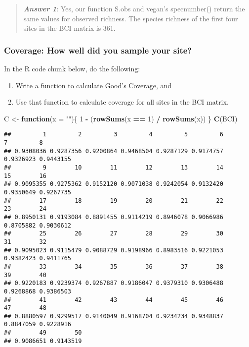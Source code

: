 \documentclass[
]{article}
\newenvironment{Shaded}{\begin{snugshade}}{\end{snugshade}}
\newcommand{\AttributeTok}[1]{\textcolor[rgb]{0.13,0.29,0.53}{#1}}
\newcommand{\ControlFlowTok}[1]{\textcolor[rgb]{0.13,0.29,0.53}{\textbf{#1}}}
\newcommand{\DecValTok}[1]{\textcolor[rgb]{0.00,0.00,0.81}{#1}}
\newcommand{\FunctionTok}[1]{\textcolor[rgb]{0.13,0.29,0.53}{\textbf{#1}}}
\newcommand{\NormalTok}[1]{#1}
\newcommand{\OtherTok}[1]{\textcolor[rgb]{0.56,0.35,0.01}{#1}}
\newcommand{\SpecialCharTok}[1]{\textcolor[rgb]{0.81,0.36,0.00}{\textbf{#1}}}
\newcommand{\StringTok}[1]{\textcolor[rgb]{0.31,0.60,0.02}{#1}}
\begin{document}
\begin{quote}
\textbf{\emph{Answer 1}}: Yes, our function S.obs and vegan's
specnumber() return the same values for observed richness. The species
richness of the first four sites in the BCI matrix is 361.
\end{quote}

\subsubsection{Coverage: How well did you sample your
site?}\label{coverage-how-well-did-you-sample-your-site}

In the R code chunk below, do the following:

\begin{enumerate}
\def\labelenumi{\arabic{enumi}.}
\item
  Write a function to calculate Good's Coverage, and
\item
  Use that function to calculate coverage for all sites in the BCI
  matrix.
\end{enumerate}

\begin{Shaded}
\begin{Highlighting}[]
\NormalTok{C }\OtherTok{\textless{}{-}} \ControlFlowTok{function}\NormalTok{(}\AttributeTok{x =} \StringTok{""}\NormalTok{)\{}
  \DecValTok{1} \SpecialCharTok{{-}}\NormalTok{ (}\FunctionTok{rowSums}\NormalTok{(x }\SpecialCharTok{==} \DecValTok{1}\NormalTok{) }\SpecialCharTok{/} \FunctionTok{rowSums}\NormalTok{(x))}
\NormalTok{\}}
\FunctionTok{C}\NormalTok{(BCI)}
\end{Highlighting}
\end{Shaded}

\begin{verbatim}
##         1         2         3         4         5         6         7         8 
## 0.9308036 0.9287356 0.9200864 0.9468504 0.9287129 0.9174757 0.9326923 0.9443155 
##         9        10        11        12        13        14        15        16 
## 0.9095355 0.9275362 0.9152120 0.9071038 0.9242054 0.9132420 0.9350649 0.9267735 
##        17        18        19        20        21        22        23        24 
## 0.8950131 0.9193084 0.8891455 0.9114219 0.8946078 0.9066986 0.8705882 0.9030612 
##        25        26        27        28        29        30        31        32 
## 0.9095023 0.9115479 0.9088729 0.9198966 0.8983516 0.9221053 0.9382423 0.9411765 
##        33        34        35        36        37        38        39        40 
## 0.9220183 0.9239374 0.9267887 0.9186047 0.9379310 0.9306488 0.9268868 0.9386503 
##        41        42        43        44        45        46        47        48 
## 0.8880597 0.9299517 0.9140049 0.9168704 0.9234234 0.9348837 0.8847059 0.9228916 
##        49        50 
## 0.9086651 0.9143519
\end{verbatim}
\end{document}
